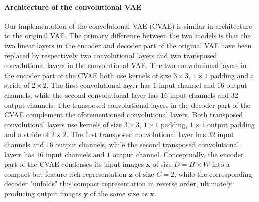 
\paragraph{Architecture of the convolutional VAE}
Our implementation of the convolutional VAE  (CVAE) is similar in architecture to the original VAE\@. The primary difference between the two models is that the two linear layers in the encoder and decoder part of the original VAE have been replaced by respectively two convolutional layers and two transposed convolutional layers in the convolutional VAE\@. The two convolutional layers in the encoder part of the CVAE both use kernels of size $3\times 3$, $1\times 1$ padding and a stride of $2\times2$. The first convolutional layer has $1$ input channel and $16$ output channels, while the second convolutional layer has $16$ input channels and $32$ output channels. The transposed convolutional layers in the decoder part of the CVAE complement the aforementioned convolutional layers. Both transposed convolutional layers use kernels of size $3\times3$, $1\times 1$ padding, $1\times 1$ output padding and a stride of $2\times 2$. The first transposed convolutional layer has $32$ input channels and $16$ output channels, while the second transposed convolutional layers has $16$ input channels and $1$ output channel. Conceptually, the encoder part of the CVAE condenses its input images $\mathbf{x}$ of size $D = H \times W$ into a compact but feature rich representation $\mathbf{z}$ of size $C = 2$, while the corresponding decoder "unfolds" this compact representation in reverse order, ultimately producing output images $\mathbf{y}$ of the same size as $\mathbf{x}$. 
